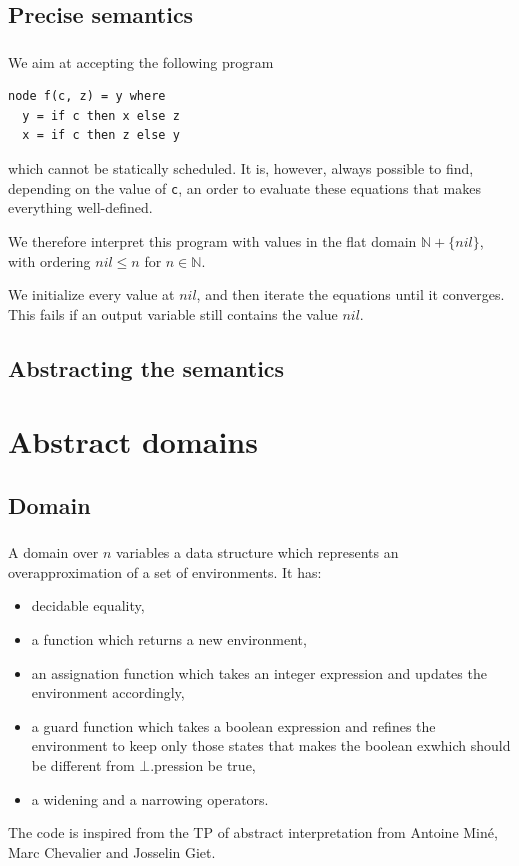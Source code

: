 \documentclass[professionalfonts]{beamer}
\makeatletter
\newcommand*{\currentname}{\@currentlabelname}
\def\ft{\frametitle{\currentname}}
\makeatother
\begin{document}
\subsection{Precise semantics}
\begin{frame}[fragile]
  \ft{}

  We aim at accepting the following program
  \begin{verbatim}
node f(c, z) = y where
  y = if c then x else z
  x = if c then z else y
  \end{verbatim}
  which cannot be statically scheduled.  It is, however, always possible to find, depending on
  the value of \texttt{c}, an order to evaluate these equations that makes everything
  well-defined.

  We therefore interpret this program with values in the flat domain \(\mathbb{N} + \{nil\}\),
  with ordering \(nil \leq n\) for \(n\in\mathbb{N}\).

  We initialize every value at \(nil\), and then iterate the equations until it converges.  This
  fails if an output variable still contains the value \(nil\).
\end{frame}

\subsection{Abstracting the semantics}
\begin{frame}
  \ft{}


\end{frame}

\section{Abstract domains}
\subsection{Domain}
\begin{frame}
  \ft{}
  A domain over $n$ variables a data structure
  which represents an overapproximation of a
  set of environments. It has:

  \begin{itemize}
  \item decidable equality,
  \item a function which returns a new environment,
  \item an assignation function which takes an integer expression and updates the environment
    accordingly,
  \item a guard function which takes a boolean expression and refines the environment to keep
    only those states that makes the boolean exwhich should be different from $\bot$.pression be
    true,
  \item a widening and a narrowing operators.
  \end{itemize}

  The code is inspired from the TP of abstract interpretation
  from Antoine Miné, Marc Chevalier and Josselin Giet.
\end{frame}
\end{document}
